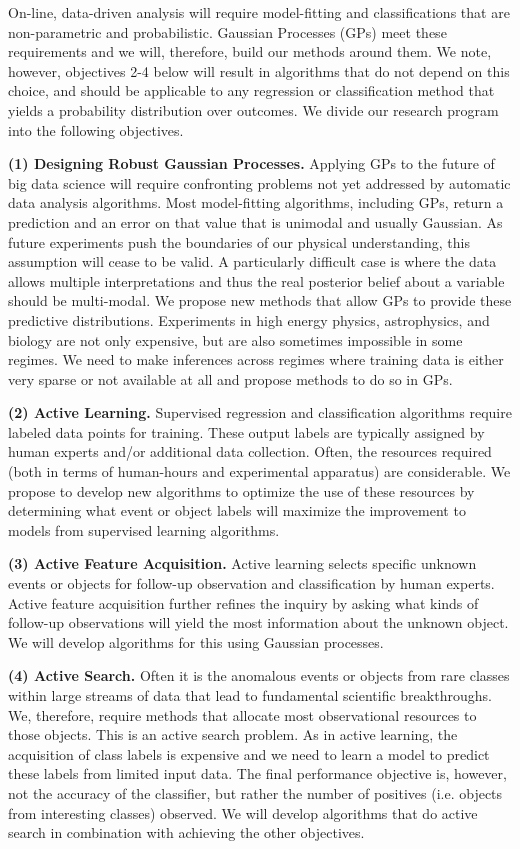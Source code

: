 \documentclass[prd,nofootbib,floatfix,11pt,tightenlines,nofootinbib]{revtex4}
\begin{document}
On-line, data-driven analysis will require model-fitting and
classifications that are non-parametric and probabilistic.  Gaussian
Processes (GPs) meet these requirements and we will, therefore, build our
methods around them.  We note, however, objectives 2-4 below will result in
algorithms that do not depend on this choice, and should be applicable to
any regression or classification method that yields a probability
distribution over outcomes.  We divide our research program into the
following objectives.

{\bf (1) Designing Robust Gaussian Processes.}  Applying GPs to the future
of big data science will require confronting problems not yet addressed by
automatic data analysis algorithms. Most model-fitting algorithms,
including GPs, return a prediction and an error on that value that is
unimodal and usually Gaussian.  As future experiments push the boundaries
of our physical understanding, this assumption will cease to be valid.  A
particularly difficult case is where the data allows multiple
interpretations and thus the real posterior belief about a variable should
be multi-modal.  We propose new methods that allow GPs to provide these
predictive distributions.  Experiments in high energy physics,
astrophysics, and biology are not only expensive, but are also sometimes
impossible in some regimes.  We need to make inferences across regimes
where training data is either very sparse or not available at all and
propose methods to do so in GPs.

{\bf (2) Active Learning.} Supervised regression and classification
algorithms require labeled data points for training.  These output labels
are typically assigned by human experts and/or additional data
collection.  Often, the resources required (both in terms of human-hours
and experimental apparatus) are considerable.  We propose to develop new
algorithms to optimize the use of these resources by determining what event
or object labels will maximize the improvement to models from supervised
learning algorithms.

{\bf (3) Active Feature Acquisition.}  Active learning selects specific
unknown events or objects for follow-up observation and classification by
human experts.  Active feature acquisition further refines the inquiry by
asking what kinds of follow-up observations will yield the most information
about the unknown object.  We will develop algorithms for this using
Gaussian processes.

{\bf (4) Active Search.} Often it is the anomalous events or objects from
rare classes within large streams of data that lead to fundamental
scientific breakthroughs. We, therefore, require methods that allocate most
observational resources to those objects.  This is an active search
problem. As in active learning, the acquisition of class labels is
expensive and we need to learn a model to predict these labels from limited
input data. The final performance objective is, however, not the accuracy
of the classifier, but rather the number of positives (i.e. objects from
interesting classes) observed.  We will develop algorithms that do active
search in combination with achieving the other objectives.
\end{document}
